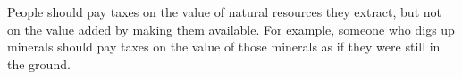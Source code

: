 People should pay taxes on the value of natural resources they extract, but not on the value added by making them available.
For example, someone who digs up minerals should pay taxes on the value of those minerals as if they were still in the ground.